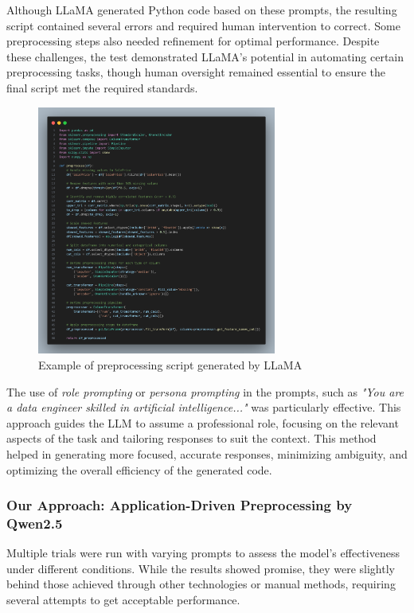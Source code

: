 Although LLaMA generated Python code based on these prompts, the resulting
script contained several errors and required human intervention to correct.
Some preprocessing steps also needed refinement for optimal performance.
Despite these challenges, the test demonstrated LLaMA's potential in automating
certain preprocessing tasks, though human oversight remained essential to
ensure the final script met the required standards.

\begin{figure}[H] 
    \centering 
    \includegraphics[width=0.7\textwidth]{media/LlamaCode.png} 
    \caption{Example of preprocessing script generated by LLaMA} 
\end{figure}

The use of \textit{role prompting} or \textit{persona prompting} in the
prompts, such as \textit{"You are a data engineer skilled in artificial
    intelligence..."} was particularly effective. This approach guides the LLM to
assume a professional role, focusing on the relevant aspects of the task and
tailoring responses to suit the context. This method helped in generating more
focused, accurate responses, minimizing ambiguity, and optimizing the overall
efficiency of the generated code.

\subsubsection{Our Approach: Application-Driven Preprocessing by Qwen2.5}

Multiple trials were run with varying prompts to assess the model's
effectiveness under different conditions. While the results showed promise,
they were slightly behind those achieved through other technologies or manual
methods, requiring several attempts to get acceptable performance.

